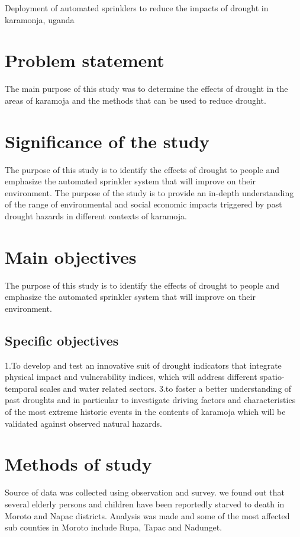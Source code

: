 \documentclass[11Spt,]{article}
\begin{document}
Deployment of automated sprinklers to reduce the impacts of drought in karamonja, uganda


\section{Problem statement}
The main purpose of this study was to determine the effects of drought in the areas of karamoja and the methods that can be used to reduce drought.
\section{Significance of the study}
The purpose of this study is to identify the effects of drought to people and emphasize the automated sprinkler system that will improve on their environment. 
	The purpose of the study is to provide an in-depth understanding of the range of environmental and social economic impacts triggered by past drought hazards in different contexts of karamoja.
\section{Main objectives}
The purpose of this study is to identify the effects of drought to people and emphasize the automated sprinkler system that will improve on their environment.
\subsection{Specific objectives}
1.To develop and test an innovative suit of drought indicators that integrate physical impact and vulnerability indices, which will address different spatio-temporal scales and water related sectors.
3.to foster a better understanding of past droughts and in particular to investigate driving factors and characteristics of the most extreme historic events in the contents of karamoja which will be validated against observed natural hazards.
\section{Methods of study}
Source of data was collected using observation and survey. we found out that several elderly persons and children have been reportedly starved to death in Moroto and Napac districts.
Analysis was made and some of the most affected sub counties in Moroto include Rupa, Tapac and Nadunget.
\end{document}
